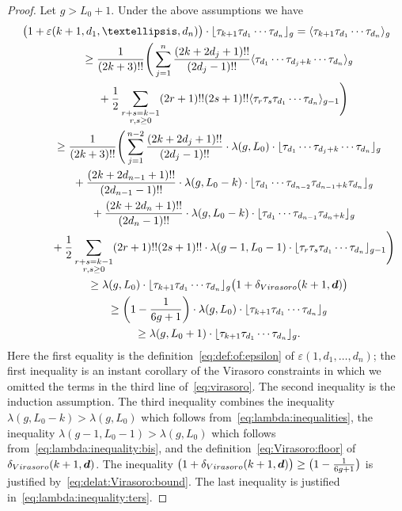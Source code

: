 \documentclass[11pt]{article}
\renewcommand{\epsilon}{\varepsilon}
\theoremstyle{definition}
\begin{document}
\begin{proof}
Let $g> L_0+1$. Under the above assumptions we have
\begin{gather*}
\big(1+\epsilon(k+1,d_1,\dots,d_n)\big)\cdot\lfloor\tau_{k+1}\tau_{d_1}\cdots\tau_{d_n}\rfloor_g
=\langle\tau_{k+1}\tau_{d_1}\cdots\tau_{d_n}\rangle_g
 \\
 \qquad{} \ge
\frac{1}{(2k+3)!!}
\Bigg(\sum_{j=1}^n
\frac{(2k+2d_j+1)!!}{(2d_j-1)!!}\langle\tau_{d_1}\cdots
\tau_{d_{j}+k}\cdots\tau_{d_n}\rangle_g\\
\qquad\quad{} +\frac{1}{2}\sum_{\substack{r+s=k-1\\r,s\ge 0}}
(2r+1)!!(2s+1)!!\langle\tau_r\tau_s\tau_{d_1}\cdots\tau_{d_n}\rangle_{g-1}
\Bigg)
\\ \qquad{} \ge
\frac{1}{(2k+3)!!}
\Bigg(\sum_{j=1}^{n-2}
\frac{(2k+2d_j+1)!!}{(2d_j-1)!!}
\cdot\lambda(g,L_0)\cdot
\lfloor\tau_{d_1}\cdots
\tau_{d_{j}+k}\cdots\tau_{d_n}\rfloor_g
\\
\qquad\quad {}+\frac{(2k+2d_{n-1}+1)!!}{(2d_{n-1}-1)!!}
\cdot\lambda(g,L_0-k)\cdot
\lfloor\tau_{d_1}\cdots\tau_{d_{n-2}}
\tau_{d_{n-1}+k}\tau_{d_n}\rfloor_g
\\
\qquad\quad {}+\frac{(2k+2d_{n}+1)!!}{(2d_{n}-1)!!}
\cdot\lambda(g,L_0-k)\cdot
\lfloor\tau_{d_1}\cdots\tau_{d_{n-1}}
\tau_{d_{n}+k}\rfloor_g
\\
\qquad\quad {}+\frac{1}{2}\sum_{\substack{r+s=k-1\\r,s\ge 0}}
(2r+1)!!(2s+1)!!
\cdot\lambda(g-1,L_0-1)\cdot
\lfloor\tau_r\tau_s\tau_{d_1}\cdots\tau_{d_n}\rfloor_{g-1}
\Bigg)
\\
\qquad{} \ge\lambda(g,L_0)\cdot\lfloor\tau_{k+1}\tau_{d_1}\cdots\tau_{d_n}\rfloor_g
\big(1+\delta_{\rm Virasoro}(k+1,\boldsymbol{d})\big)
\\
\qquad{} \ge\left(1-\frac{1}{6g+1}\right)\cdot\lambda(g,L_0)\cdot\lfloor\tau_{k+1}\tau_{d_1}\cdots\tau_{d_n}\rfloor_g
\\
\qquad{} \ge\lambda(g,L_0+1)\cdot\lfloor\tau_{k+1}\tau_{d_1}\cdots\tau_{d_n}\rfloor_g .
\end{gather*}
Here the first equality is
the definition~\eqref{eq:def:of:epsilon}
of $\epsilon(1,d_1,\dots,d_n)$;
the first inequality
is an instant corollary of the
Virasoro constraints in which we omitted
the terms in the third line of~\eqref{eq:virasoro}.
The second inequality is the induction assumption.
The third inequality combines
the inequality $\lambda(g,L_0-k)>\lambda(g,L_0)$
which follows from~\eqref{eq:lambda:inequalities},
the inequality $\lambda(g-1,L_0-1)>\lambda(g,L_0)$
which follows from~\eqref{eq:lambda:inequality:bis},
and the definition~\eqref{eq:Virasoro:floor}
of $\delta_{\rm Virasoro}(k+1,\boldsymbol{d})$.
The inequality
$\big(1+\delta_{\rm Virasoro}(k+1,\boldsymbol{d})\big)\ge
\big(1-\frac{1}{6g+1}\big)$ is justified by~\eqref{eq:delat:Virasoro:bound}.
The last inequality is justified in~\eqref{eq:lambda:inequality:ters}.


\end{proof}
\end{document}
